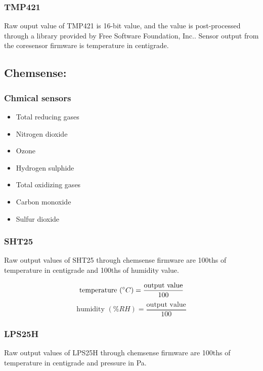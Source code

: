 \subsubsection{ TMP421}

Raw ouput value of TMP421 is 16-bit value, and the value is post-processed through a library provided by Free Software Foundation, Inc.. Sensor output from the coresensor firmware is temperature in centigrade.


\subsection{Chemsense:}
\subsubsection{ Chmical sensors}

\begin{itemize}
  \item Total reducing gases
  \item Nitrogen dioxide
  \item Ozone
  \item Hydrogen sulphide
  \item Total oxidizing gases
  \item Carbon monoxide
  \item Sulfur dioxide
\end{itemize}


\subsubsection{ SHT25}

Raw output values of SHT25 through chemsense firmware are 100ths of temperature in centigrade and 100ths of humidity value.

{\centering
 \[ \text{temperature }(\degree C) = \frac{\text{output value}}{100} \]
 \[ \text{humidity }(\% RH) = \frac{\text{output value}}{100} \]
 \par
 }

\subsubsection{ LPS25H}

Raw output values of LPS25H through chemsense firmware are 100ths of temperature in centigrade and pressure in Pa.

